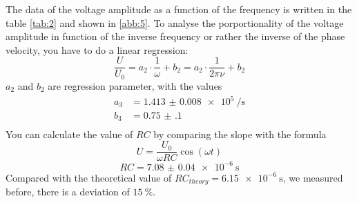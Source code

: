 The data of the voltage amplitude as a function of the frequency is written in
the table \ref{tab:2} and shown in \ref{abb:5}. To analyse the porportionality
of the voltage amplitude in function of the inverse frequency or rather the
inverse of the phase velocity, you have to do a linear regression:
\begin{equation*}
  \frac{U}{U_0} = a_2 \cdot \frac{1}{\omega} + b_2 = a_2 \cdot \frac{1}{2 \pi \nu} + b_2
\end{equation*}
$a_2$ and $b_2$ are regression parameter, with the values
\begin{align*}
  a_3 &= \SI{1.413(8)e5}{\per\second} \\
  b_3 &= \SI{0.75(10)}{} \\
\end{align*}
You can calculate the value of $RC$ by comparing the slope with the formula
\begin{equation}
  \label{eq:1}
  U = \frac{U_0}{\omega R C} \cos{(\omega t)}
\end{equation}
\begin{equation*}
  RC = \SI{7.08(4)e-6}{\second}
\end{equation*}
Compared with the theoretical value of $RC_{theory}= \SI{6.15e-6}{\second}$, we measured before,  there is a
deviation of $\SI{15}{\percent}$.

